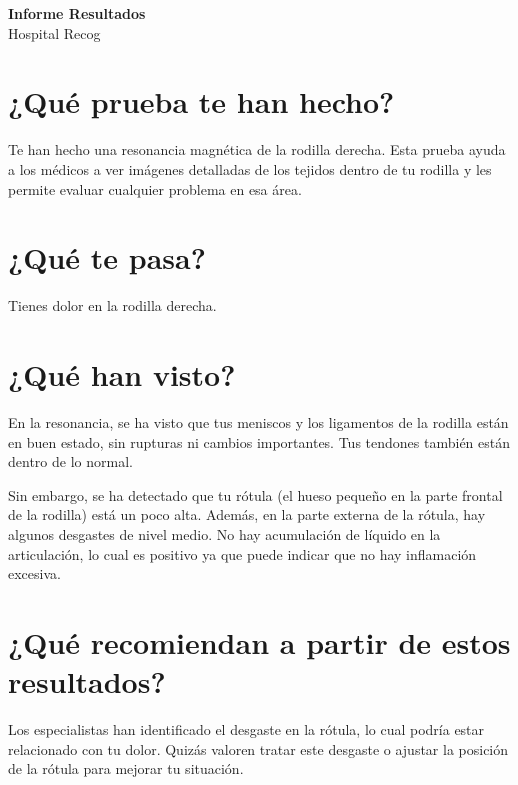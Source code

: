 \documentclass[11pt,a4paper]{article}
\begin{document}

\vspace*{2.5cm} %

{\Huge \textbf{Informe Resultados}} \\[0.2cm]
{\large \color{grisTexto!80!black} Hospital Recog}

\vspace{0.5cm}


\section*{¿Qué prueba te han hecho?}
Te han hecho una resonancia magnética de la rodilla derecha. Esta prueba ayuda a los médicos a ver imágenes detalladas de los tejidos dentro de tu rodilla y les permite evaluar cualquier problema en esa área.

\section*{¿Qué te pasa?}
Tienes dolor en la rodilla derecha.

\section*{¿Qué han visto?}
En la resonancia, se ha visto que tus meniscos y los ligamentos de la rodilla están en buen estado, sin rupturas ni cambios importantes. Tus tendones también están dentro de lo normal.

Sin embargo, se ha detectado que tu rótula (el hueso pequeño en la parte frontal de la rodilla) está un poco alta. Además, en la parte externa de la rótula, hay algunos desgastes de nivel medio. No hay acumulación de líquido en la articulación, lo cual es positivo ya que puede indicar que no hay inflamación excesiva.

\section*{¿Qué recomiendan a partir de estos resultados?}
Los especialistas han identificado el desgaste en la rótula, lo cual podría estar relacionado con tu dolor. Quizás valoren tratar este desgaste o ajustar la posición de la rótula para mejorar tu situación.
\end{document}
